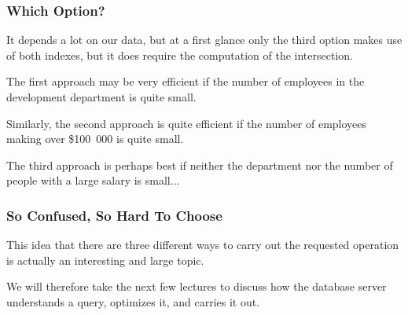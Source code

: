 \begin{frame}
\frametitle{Which Option?}

It depends a lot on our data, but at a first glance only the third option makes use of both indexes, but it does require the computation of the intersection. 

The first approach may be very efficient if the number of employees in the development department is quite small. 

Similarly, the second approach is quite efficient if the number of employees making over \$100~000 is quite small. 

The third approach is perhaps best if neither the department nor the number of people with a large salary is small...

\end{frame}

\begin{frame}
\frametitle{So Confused, So Hard To Choose}

This idea that there are three different ways to carry out the requested operation is actually an interesting and large topic. 

We will therefore take the next few lectures to discuss how the database server understands a query, optimizes it, and carries it out. 


\end{frame}




